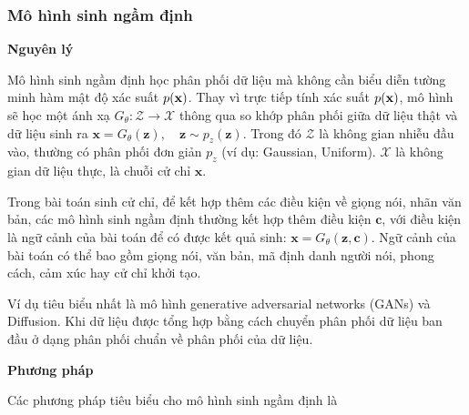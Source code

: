 

\subsubsection{Mô hình sinh ngầm định}
\label{sec:ImplicitGenerativeModels}

\textbf{Nguyên lý}




Mô hình sinh ngầm định học phân phối dữ liệu mà không cần biểu diễn tường minh hàm mật độ xác suất $p(\mathbf{x})$. Thay vì trực tiếp tính xác suất $p(\mathbf{x})$, mô hình sẽ học một ánh xạ $G_{\theta}: \mathcal{Z} \to \mathcal{X}$ thông qua so khớp phân phối giữa dữ liệu thật và dữ liệu sinh ra $\mathbf{x} = G_\theta(\mathbf{z}), \quad \mathbf{z} \sim p_z(\mathbf{z})$.  Trong đó $\mathcal{Z}$ là không gian nhiễu đầu vào, thường có phân phối đơn giản \(p_{z}\) (ví dụ: Gaussian, Uniform). \(\mathcal{X}\) là không gian dữ liệu thực, là chuỗi cử chỉ \(\mathbf{x}\). 

Trong bài toán sinh cử chỉ, để kết hợp thêm các điều kiện về giọng nói, nhãn văn bản, các mô hình sinh ngầm định thường kết hợp thêm điều kiện $\mathbf{c}$, với điều kiện là ngữ cảnh của bài toán để có được kết quả sinh: $\mathbf{x} = G_\theta(\mathbf{z}, \mathbf{c})$. Ngữ cảnh của bài toán có thể bao gồm giọng nói, văn bản, mã định danh người nói, phong cách, cảm xúc hay cử chỉ khởi tạo.

%
Ví dụ tiêu biểu nhất là mô hình generative adversarial networks (GANs) và Diffusion. Khi dữ liệu được tổng hợp bằng cách chuyển phân phối dữ liệu ban đầu ở dạng phân phối chuẩn về phân phối của dữ liệu.

\textbf{Phương pháp} 

Các phương pháp tiêu biểu cho mô hình sinh ngầm định là 

